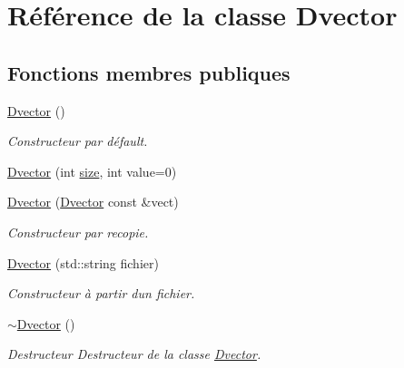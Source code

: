 \hypertarget{class_dvector}{}\section{Référence de la classe Dvector}
\label{class_dvector}
\subsection*{Fonctions membres publiques}
\begin{DoxyCompactItemize}
\item 
\mbox{\label{class_dvector_adf0f620df0feef3311f7d198e649a298}} 
\hyperlink{class_dvector_adf0f620df0feef3311f7d198e649a298}{Dvector} ()
\begin{DoxyCompactList}\small\item\em Constructeur par défault. \end{DoxyCompactList}\item 
\hyperlink{class_dvector_a8a4feb509178ccc26a7d3805548fab17}{Dvector} (int \hyperlink{class_dvector_a964b4f5cc235ba6aaf9c5e437318be87}{size}, int value=0)
\item 
\hyperlink{class_dvector_aa3a4f95e9bfe8139537593f86640d3af}{Dvector} (\hyperlink{class_dvector}{Dvector} const \&vect)
\begin{DoxyCompactList}\small\item\em Constructeur par recopie. \end{DoxyCompactList}\item 
\mbox{\label{class_dvector_a2f2c20eb463fe2fd695493b5d6871244}} 
\hyperlink{class_dvector_a2f2c20eb463fe2fd695493b5d6871244}{Dvector} (std\+::string fichier)
\begin{DoxyCompactList}\small\item\em Constructeur à partir d\textquotesingle{}un fichier. \end{DoxyCompactList}\item 
\mbox{\label{class_dvector_a3156d0776c5da1a15685970200ec6b96}} 
\hyperlink{class_dvector_a3156d0776c5da1a15685970200ec6b96}{$\sim$\+Dvector} ()
\begin{DoxyCompactList}\small\item\em Destructeur Destructeur de la classe \hyperlink{class_dvector}{Dvector}. \end{DoxyCompactList}\item 

\end{DoxyCompactItemize}
